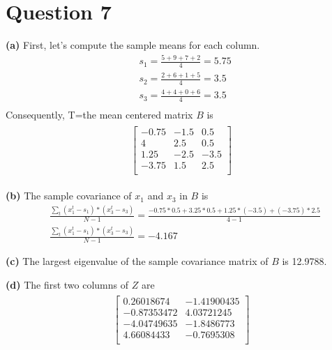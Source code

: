 \documentclass[leqno]{article}
\begin{document}
\section*{Question 7} \textbf{(a)} First, let's compute the sample means for each column.
\begin{equation*}
\begin{split}
&s_1 = \frac{5 + 9 + 7 + 2}{4} = 5.75 \\
&s_2 = \frac{2+6+1+5}{4} = 3.5\\
&s_3 = \frac{4+4+0+6}{4} = 3.5\\
\end{split}
\end{equation*}
Consequently, T=the mean centered matrix $B$ is
\begin{gather*}
\begin{split}
\begin{bmatrix} 
   -0.75 & -1.5 & 0.5\\
   4 & 2.5 & 0.5\\
   1.25 & -2.5 & -3.5\\
   -3.75 & 1.5 & 2.5\\
\end{bmatrix}
\end{split}
\end{gather*}

\noindent \textbf{(b)} The sample covariance of $x_1$ and $x_3$ in $B$ is
\begin{equation*}
\begin{split}
&\frac{\sum_t(x_1^t - s_1)*(x_3^t - s_3)}{N - 1} = \frac{-0.75*0.5 + 3.25*0.5 + 1.25*(-3.5) + (-3.75)*2.5}{4 - 1}\\
&\frac{\sum_t(x_1^t - s_1)*(x_3^t - s_3)}{N - 1} = -4.167
\end{split}
\end{equation*}

\noindent \textbf{(c)} The largest eigenvalue of the sample covariance matrix of $B$ is 12.9788. 

\noindent \textbf{(d)} The first two columns of $Z$ are 
\begin{gather*}
\begin{split}
  \begin{bmatrix}
   0.26018674 & -1.41900435\\
   -0.87353472 & 4.03721245\\
   -4.04749635 & -1.8486773\\
   4.66084433 & -0.7695308\\
\end{bmatrix}
\end{split}
\end{gather*}
\end{document}
